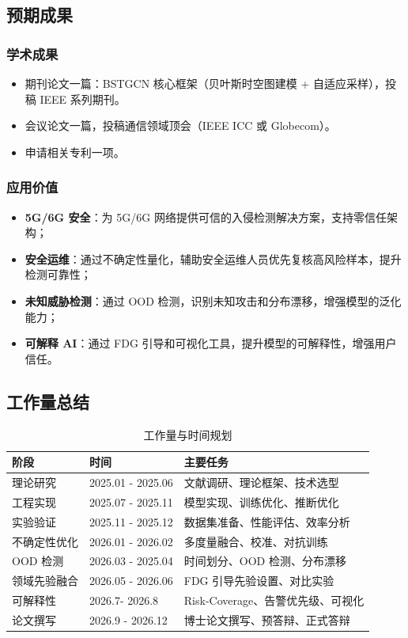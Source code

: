 \subsection{预期成果}

\subsubsection{学术成果}

\begin{itemize}
  \item 期刊论文一篇：BSTGCN 核心框架（贝叶斯时空图建模 + 自适应采样），投稿 IEEE 系列期刊。
  \item 会议论文一篇，投稿通信领域顶会（IEEE ICC 或 Globecom）。
  \item 申请相关专利一项。
\end{itemize}



\subsubsection{应用价值}

\begin{itemize}
  \item \textbf{5G/6G 安全}：为 5G/6G 网络提供可信的入侵检测解决方案，支持零信任架构；
  \item \textbf{安全运维}：通过不确定性量化，辅助安全运维人员优先复核高风险样本，提升检测可靠性；
  \item \textbf{未知威胁检测}：通过 OOD 检测，识别未知攻击和分布漂移，增强模型的泛化能力；
  \item \textbf{可解释 AI}：通过 FDG 引导和可视化工具，提升模型的可解释性，增强用户信任。
\end{itemize}

\subsection{工作量总结}

\begin{table}[h]
\centering
\begin{tabular}{lll}
\hline
\textbf{阶段} & \textbf{时间} & \textbf{主要任务} \\
\hline
理论研究 & 2025.01 - 2025.06 & 文献调研、理论框架、技术选型 \\
工程实现 & 2025.07 - 2025.11 & 模型实现、训练优化、推断优化 \\
实验验证 & 2025.11 - 2025.12 & 数据集准备、性能评估、效率分析 \\
不确定性优化 & 2026.01 - 2026.02 & 多度量融合、校准、对抗训练 \\
OOD 检测 & 2026.03 - 2025.04 & 时间划分、OOD 检测、分布漂移 \\
领域先验融合 & 2026.05 - 2026.06 & FDG 引导先验设置、对比实验 \\
可解释性 & 2026.7- 2026.8 & Risk-Coverage、告警优先级、可视化 \\
论文撰写 & 2026.9 - 2026.12 & 博士论文撰写、预答辩、正式答辩 \\
\hline
\end{tabular}
\caption{工作量与时间规划}
\end{table}

